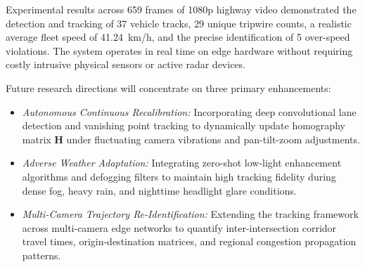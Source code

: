 \documentclass[conference]{IEEEtran}
\begin{document}
Experimental results across 659 frames of 1080p highway video demonstrated the detection and tracking of 37 vehicle tracks, 29 unique tripwire counts, a realistic average fleet speed of 41.24~km/h, and the precise identification of 5 over-speed violations. The system operates in real time on edge hardware without requiring costly intrusive physical sensors or active radar devices.

Future research directions will concentrate on three primary enhancements:
\begin{itemize}
    \item[\textit{i)}] \textit{Autonomous Continuous Recalibration:} Incorporating deep convolutional lane detection and vanishing point tracking to dynamically update homography matrix $\mathbf{H}$ under fluctuating camera vibrations and pan-tilt-zoom adjustments.
    \item[\textit{ii)}] \textit{Adverse Weather Adaptation:} Integrating zero-shot low-light enhancement algorithms and defogging filters to maintain high tracking fidelity during dense fog, heavy rain, and nighttime headlight glare conditions.
    \item[\textit{iii)}] \textit{Multi-Camera Trajectory Re-Identification:} Extending the tracking framework across multi-camera edge networks to quantify inter-intersection corridor travel times, origin-destination matrices, and regional congestion propagation patterns.
\end{itemize}
\end{document}
